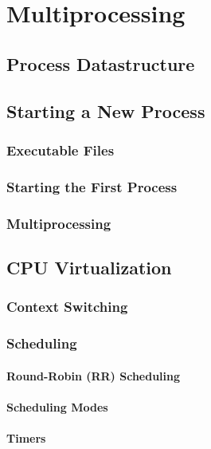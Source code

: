 \section{Multiprocessing}
\subsection{Process Datastructure}


\subsection{Starting a New Process}
\subsubsection{Executable Files}


\subsubsection{Starting the First Process}
\subsubsection{Multiprocessing}



\subsection{CPU Virtualization}

\subsubsection{Context Switching}

\subsubsection{Scheduling}
\paragraph{Round-Robin (RR) Scheduling}


\paragraph{Scheduling Modes}



\paragraph{Timers}

